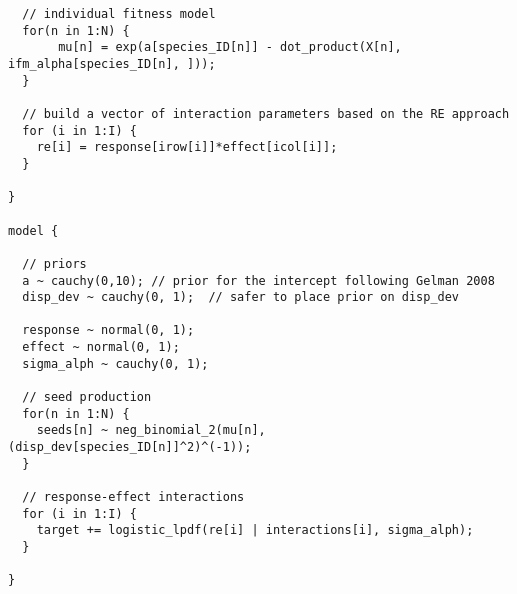 \documentclass[a4,12pt]{article}
\begin{document}
\begin{lstlisting}
  // individual fitness model 
  for(n in 1:N) {
       mu[n] = exp(a[species_ID[n]] - dot_product(X[n], ifm_alpha[species_ID[n], ]));  
  }
  
  // build a vector of interaction parameters based on the RE approach
  for (i in 1:I) {
    re[i] = response[irow[i]]*effect[icol[i]];
  }
  
} 

model {

  // priors
  a ~ cauchy(0,10); // prior for the intercept following Gelman 2008
  disp_dev ~ cauchy(0, 1);  // safer to place prior on disp_dev
  
  response ~ normal(0, 1);   
  effect ~ normal(0, 1);
  sigma_alph ~ cauchy(0, 1);

  // seed production 
  for(n in 1:N) {
    seeds[n] ~ neg_binomial_2(mu[n], (disp_dev[species_ID[n]]^2)^(-1));
  }

  // response-effect interactions
  for (i in 1:I) {
    target += logistic_lpdf(re[i] | interactions[i], sigma_alph);
  }
  
} 



        \end{lstlisting}
\end{document}
